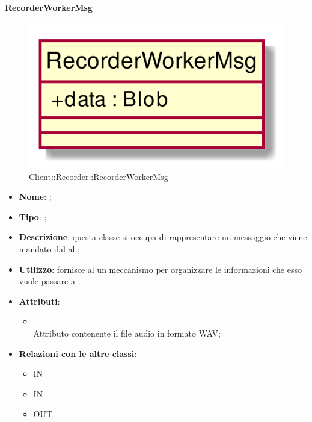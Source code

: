 \hypertarget{RecorderWorkerMsg_label}{\paragraph{RecorderWorkerMsg}}
\begin{figure}[h]
	\centering
	\includegraphics[width=\textwidth,height=\textheight,keepaspectratio]{images/ClassRecorderWorkerMsg.png}
	\caption{Client::Recorder::RecorderWorkerMsg}
\end{figure}
\begin{itemize}
	\item \textbf{Nome}: ;
	\item \textbf{Tipo}: ;
	\item \textbf{Descrizione}: questa classe si occupa di rappresentare un messaggio che viene mandato dal  al ;
	\item \textbf{Utilizzo}: fornisce al  un meccanismo per organizzare le informazioni che esso vuole passare a ;
	\item \textbf{Attributi}:
	\begin{itemize}
		\item[]  \\
		Attributo contenente il file audio in formato WAV;
	\end{itemize}
	\item \textbf{Relazioni con le altre classi}:
	\begin{itemize}
		\item IN \hyperlink{RecorderWorker_label}{}
		\item IN \hyperlink{Recorder_label}{}
		\item OUT \hyperlink{RecorderWorkerConfig_label}{}
	\end{itemize}
\end{itemize}
\FloatBarrier

